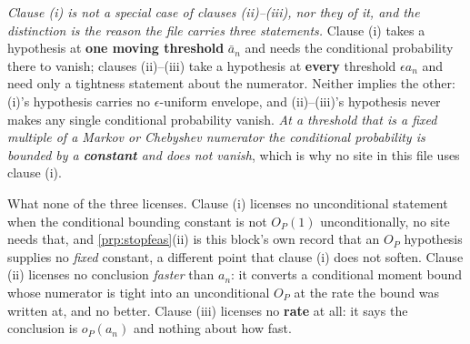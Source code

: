 \begin{remark}\label{rem:pconvsites}
\emph{Clause (i) is not a special case of clauses (ii)--(iii), nor they of it, and the distinction is the
reason the file carries three statements.} Clause (i) takes a hypothesis at \textbf{one moving threshold}
$\bar a_n$ and needs the conditional probability there to vanish; clauses (ii)--(iii) take a hypothesis at
\textbf{every} threshold $\epsilon a_n$ and need only a tightness statement about the numerator. Neither
implies the other: (i)'s hypothesis carries no $\epsilon$-uniform envelope, and (ii)--(iii)'s hypothesis
never makes any single conditional probability vanish. \emph{At a threshold that is a fixed multiple of a
Markov or Chebyshev numerator the conditional probability is bounded by a \textbf{constant} and does not
vanish}, which is why no site in this file uses clause (i).


What none of the three licenses. Clause (i) licenses no unconditional statement when the
conditional bounding constant is not $O_P(1)$ unconditionally, no site needs that, and
\cref{prp:stopfeas}(ii) is this block's own record that an $O_P$ hypothesis supplies no \emph{fixed}
constant, a different point that clause (i) does not soften. Clause (ii) licenses no conclusion
\emph{faster} than $a_n$: it converts a conditional moment bound whose numerator is tight into an
unconditional $O_P$ at the rate the bound was written at, and no better. Clause (iii) licenses no
\textbf{rate} at all: it says the conclusion is $o_P(a_n)$ and nothing about how fast.
\end{remark}

